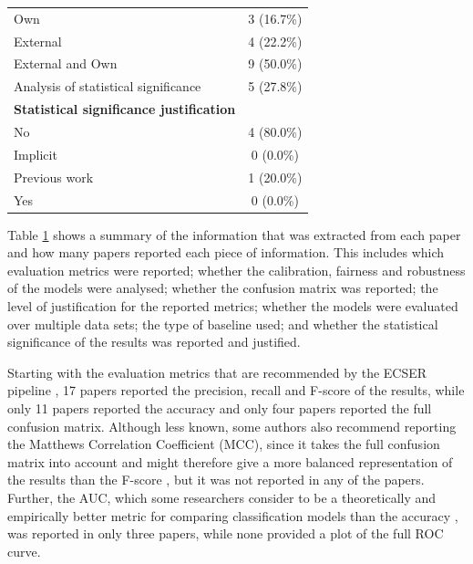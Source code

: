 \documentclass[a4paper]{article}
\begin{document}
\begin{table}[H]
\begin{tabularx}{0.7\textwidth}{|X|c|}
		\hspace{3mm} Own & 3 (16.7\%) \\
		\hspace{3mm} External & 4 (22.2\%)\\
		\hspace{3mm} External and Own & 9 (50.0\%) \\
		Analysis of statistical significance & 5 (27.8\%) \\
		\textbf{Statistical significance justification}&\\
		\hspace{3mm} No & 4 (80.0\%)  \\
		\hspace{3mm} Implicit & 0 (0.0\%) \\
		\hspace{3mm} Previous work & 1 (20.0\%) \\
		\hspace{3mm} Yes & 0 (0.0\%)  \\
		\hline
	\end{tabularx}
	\label{table:mapping_results}
\end{table}

Table \ref{table:mapping_results} shows a summary of the information that was extracted from each paper and how many papers reported each piece of information. This includes which evaluation metrics were reported; whether the calibration, fairness and robustness of the models were analysed; whether the confusion matrix was reported; the level of justification for the reported metrics; whether the models were evaluated over multiple data sets; the type of baseline used; and whether the statistical significance of the results was reported and justified.

Starting with the evaluation metrics that are recommended by the ECSER pipeline \cite{Dellanna2022}, 17 papers reported the precision, recall and F-score of the results, while only 11 papers reported the accuracy and only four papers reported the full confusion matrix. Although less known, some authors also recommend reporting the Matthews Correlation Coefficient (MCC), since it takes the full confusion matrix into account and might therefore give a more balanced representation of the results than the F-score \cite{Chicco2020}, but it was not reported in any of the papers. Further, the AUC, which some researchers consider to be a theoretically and empirically better metric for comparing classification models than the accuracy \cite{huang2005auc,ling2003auc}, was reported in only three papers, while none provided a plot of the full ROC curve.
\end{document}
